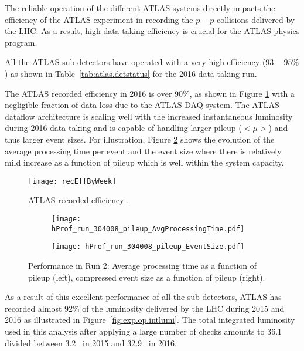The reliable operation of the different ATLAS systems directly impacts the 
efficiency of the ATLAS experiment 
in recording the $p-p$ collisions delivered by the LHC. 
As a result, high data-taking efficiency is crucial 
for the ATLAS physics program. 

All the ATLAS sub-detectors have operated with a very high efficiency 
($93-95\%$) as shown in Table~\ref{tab:atlas.detstatus} for the 2016 
data taking run.

The ATLAS recorded efficiency in 2016 is over 90\%, as shown in 
Figure \ref{fig:tdaq_diagram} with a negligible fraction of data loss due to 
the ATLAS DAQ system. 
The ATLAS dataflow architecture is scaling well with the increased 
instantaneous luminosity during 2016 data-taking and is capable of handling 
larger pileup ($<\mu>$) and thus larger event sizes.
For illustration,  Figure \ref{fig:run_pileup} shows the evolution of the 
average processing time per event and 
the event size where there is relatively mild increase as a function of pileup 
which is well within the system capacity.

\begin{figure}[t!]
\centering
\texttt{[image: recEffByWeek]} 
\caption{ATLAS recorded efficiency \cite{atlasTwiki}.}
\label{fig:tdaq_diagram}
\end{figure} 


\begin{figure}[t!]
\centering
\begin{subfigure}[t]{0.48\textwidth}
\texttt{[image: hProf\_run\_304008\_pileup\_AvgProcessingTime.pdf]}
\end{subfigure}
\begin{subfigure}[t]{0.48\textwidth}
\texttt{[image: hProf\_run\_304008\_pileup\_EventSize.pdf]}
\end{subfigure}
\vspace{-0.3cm}
\caption{Performance in Run 2: Average processing time as a function of pileup (left), compressed event size as a function of pileup (right).}
\label{fig:run_pileup}
\end{figure} 



As a result of this excellent performance of all the sub-detectors,
ATLAS has recorded  almost 92\% of the luminosity delivered by the LHC during 
2015 and 2016 as illustrated in  Figure~\ref{fig:exp.op.intlumi}.
The total integrated luminosity used in this analysis after 
applying a large number of checks amounts to 
 36.1 \ifb~ divided between 3.2 \ifb~in 2015 and 32.9 \ifb~in 2016.

